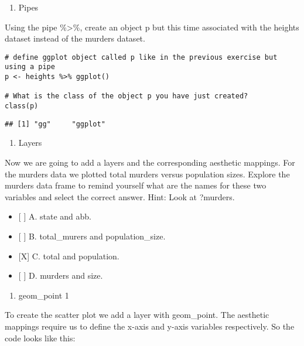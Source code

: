 \documentclass[]{article}
\providecommand{\tightlist}{%
  \setlength{\itemsep}{0pt}\setlength{\parskip}{0pt}}
\begin{document}
\begin{enumerate}
\def\labelenumi{\arabic{enumi}.}
\setcounter{enumi}{2}
\tightlist
\item
  Pipes
\end{enumerate}

Using the pipe \%\textgreater{}\%, create an object p but this time
associated with the heights dataset instead of the murders dataset.

\begin{verbatim}
# define ggplot object called p like in the previous exercise but using a pipe 
p <- heights %>% ggplot()

# What is the class of the object p you have just created?
class(p)
\end{verbatim}

\begin{verbatim}
## [1] "gg"     "ggplot"
\end{verbatim}

\begin{enumerate}
\def\labelenumi{\arabic{enumi}.}
\setcounter{enumi}{3}
\tightlist
\item
  Layers
\end{enumerate}

Now we are going to add a layers and the corresponding aesthetic
mappings. For the murders data we plotted total murders versus
population sizes. Explore the murders data frame to remind yourself what
are the names for these two variables and select the correct answer.
Hint: Look at ?murders.

\begin{itemize}
\tightlist
\item
  {[} {]} A. state and abb.
\item
  {[} {]} B. total\_murers and population\_size.
\item
  {[}X{]} C. total and population.
\item
  {[} {]} D. murders and size.
\end{itemize}

\begin{enumerate}
\def\labelenumi{\arabic{enumi}.}
\setcounter{enumi}{4}
\tightlist
\item
  geom\_point 1
\end{enumerate}

To create the scatter plot we add a layer with geom\_point. The
aesthetic mappings require us to define the x-axis and y-axis variables
respectively. So the code looks like this:
\end{document}
